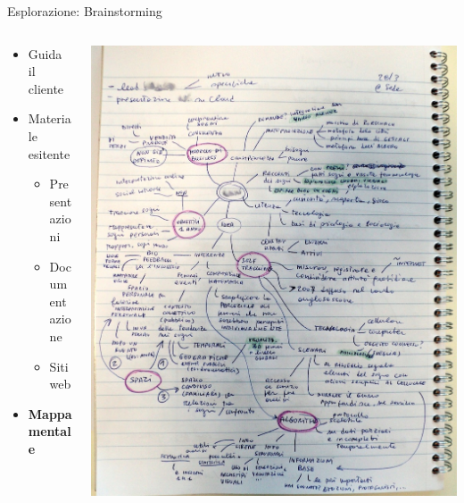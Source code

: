 	\begin{frame}{Esplorazione: Brainstorming}
		\begin{columns}[T]
		    \begin{column}{.5\textwidth}
				\begin{itemize}
					\item Guida il cliente
					\item Materiale esitente
					\begin{itemize}
						\item Presentazioni
						\item Documentazione
						\item Siti web
					\end{itemize}
				\end{itemize}	

				\begin{itemize}
					\item \textbf{Mappa mentale}
				\end{itemize}
		    \end{column}
		    \begin{column}{.5\textwidth}
				\hspace*{-0.4cm} \includegraphics[scale=0.17]{images/mindmap-1}
		    \end{column}
		 \end{columns}
	\end{frame}
	
